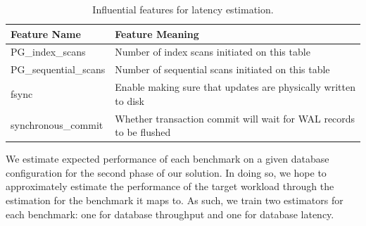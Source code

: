 \begin{table}[h!]
  \centering
  \begin{adjustbox}{max width=\linewidth}
    \begin{tabular}{ll}
      \toprule
      Feature Name          & Feature Meaning                                                    \\
      \midrule
      PG\_index\_scans      & Number of index scans initiated on this table                      \\
      PG\_sequential\_scans & Number of sequential scans initiated on this table                 \\
      fsync                 & Enable making sure that updates are physically written to disk     \\
      synchronous\_commit   & Whether transaction commit will wait for WAL records to be flushed \\
      \bottomrule
    \end{tabular}
  \end{adjustbox}

  \caption{Influential features for latency estimation.}
  \label{tab:influential_features_for_latency}
\end{table}

We estimate expected performance of each benchmark on a given database
configuration for the second phase of our solution. In doing so, we
hope to approximately estimate the performance of the target workload
through the estimation for the benchmark it maps to. As such, we train
two estimators for each benchmark: one for database throughput and one
for database latency.

